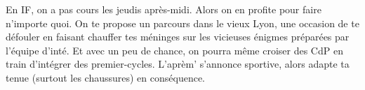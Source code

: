 En IF, on a pas cours les jeudis après-midi. Alors on en profite pour faire
n'importe quoi. On te propose un parcours dans le vieux Lyon, une occasion de te
défouler en faisant chauffer tes méninges sur les vicieuses énigmes préparées
par l'équipe d'inté. Et avec un peu de chance, on pourra même croiser des CdP en
train d'intégrer des premier-cycles.
L'aprèm' s'annonce sportive, alors adapte ta tenue (surtout les chaussures) en
conséquence. 
